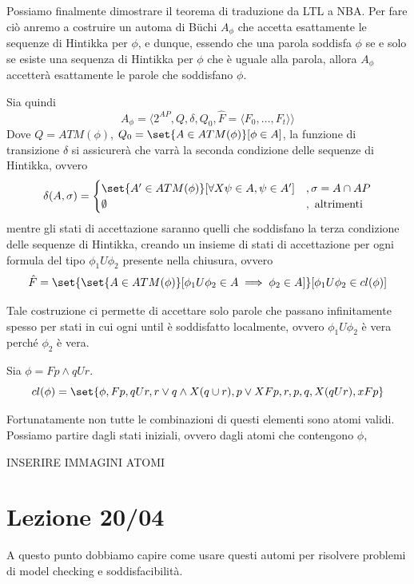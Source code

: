 Possiamo finalmente dimostrare il teorema di traduzione da LTL a NBA\@.
Per fare ciò anremo a costruire un automa di Büchi \(A_\phi\) che accetta esattamente le sequenze di Hintikka per \(\phi\), e dunque, essendo che una parola soddisfa \(\phi\) se e solo se esiste una sequenza di Hintikka per \(\phi\) che è uguale alla parola, allora \(A_\phi\) accetterà esattamente le parole che soddisfano \(\phi\).

Sia quindi \[A_\phi = \langle 2^{AP}, Q, \delta, Q_0, \hat{F} = \langle F_0, \ldots, F_t\rangle\rangle\]
Dove \(Q = ATM(\phi)\), \(Q_0 = \set{A \in ATM(\phi) }[\phi \in A]\), la funzione di transizione \(\delta\) si assicurerà che varrà la seconda condizione delle sequenze di Hintikka, ovvero
\[\delta(A,\sigma)=\begin{cases}
    \set{A'\in ATM(\phi)}[\forall X\psi \in A, \psi \in A'] & , \sigma = A \cap AP \\
    \emptyset                                               & , \text{ altrimenti}
  \end{cases}\]
mentre gli stati di accettazione saranno quelli che soddisfano la terza condizione delle sequenze di Hintikka, creando un insieme di stati di accettazione per ogni formula del tipo \(\phi_1 U \phi_2\) presente nella chiusura, ovvero
\[\hat{F} = \set{\set{A\in ATM(\phi)}[\phi_1 U \phi_2 \in A \implies \phi_2\in A]}[\phi_1 U \phi_2 \in cl(\phi)]\]

Tale costruzione ci permette di accettare solo parole che passano infinitamente spesso per stati in cui ogni until è soddisfatto localmente, ovvero \(\phi_1 U \phi_2\) è vera perché \(\phi_2\) è vera.


\begin{example}{}
  Sia \(\phi= F p \land q U r\).
  \[cl(\phi) = \set{\phi, Fp,qUr, r\lor q \land X(q\cup r),p\lor XFp, r,p,q,X(qUr),xFp}\]

  Fortunatamente non tutte le combinazioni di questi elementi sono atomi validi.
  Possiamo partire dagli stati iniziali, ovvero dagli atomi che contengono \(\phi\),

  INSERIRE IMMAGINI ATOMI
\end{example}

\chapter{Lezione 20/04}

A questo punto dobbiamo capire come usare questi automi per risolvere problemi di model checking e soddisfacibilità.

